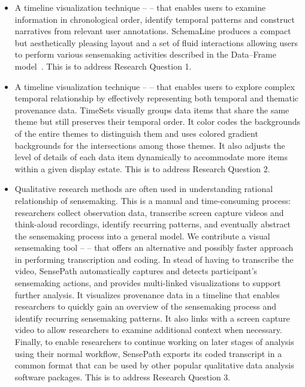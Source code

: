 \begin{itemize}
	\item A timeline visualization technique -- \emph{} -- that enables users to examine information in chronological order, identify temporal patterns and construct narratives from relevant user annotations. SchemaLine produces a compact but aesthetically pleasing layout and a set of fluid interactions allowing users to perform various sensemaking activities described in the Data--Frame model~\cite{Klein2003}. This is to address Research Question 1.
	
	\item A timeline visualization technique -- \emph{} -- that enables users to explore complex temporal relationship by effectively representing both temporal and thematic provenance data. TimeSets visually groups data items that share the same theme but still preserves their temporal order. It color codes the backgrounds of the entire themes to distinguish them and uses colored gradient backgrounds for the intersections among those themes. It also adjusts the level of details of each data item dynamically to accommodate more items within a given display estate. This is to address Research Question 2. 
	
	\item Qualitative research methods are often used in understanding rational relationship of sensemaking. This is a manual and time-consuming process: researchers collect observation data, transcribe screen capture videos and think-aloud recordings, identify recurring patterns, and eventually abstract the sensemaking process into a general model. We contribute a visual sensemaking tool -- \emph{} -- that offers an alternative and possibly faster approach in performing transcription and coding. In stead of having to transcribe the video, SensePath automatically captures and detects participant's sensemaking actions, and provides multi-linked visualizations to support further analysis. It visualizes provenance data in a timeline that enables researchers to quickly gain an overview of the sensemaking process and identify recurring sensemaking patterns. It also links with a screen capture video to allow researchers to examine  additional context when necessary. Finally, to enable researchers to continue working on later stages of analysis using their normal workflow, SensePath exports its coded transcript in a common format that can be used by other popular qualitative data analysis software packages. This is to address Research Question 3.	
	

\end{itemize}
